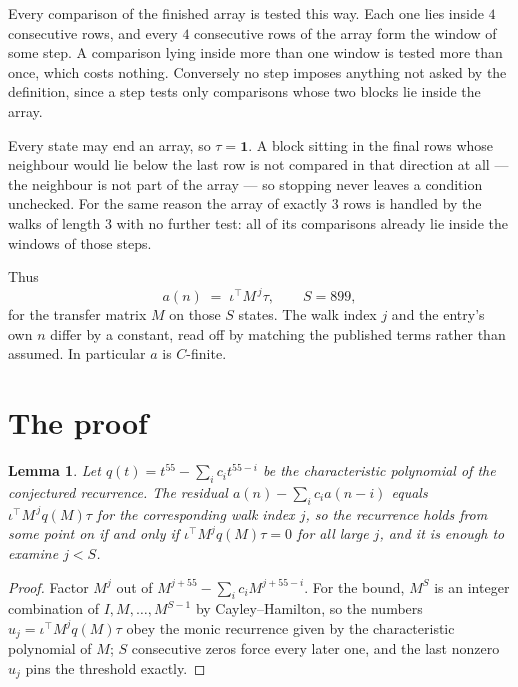 \documentclass[11pt,a4paper]{article}
\theoremstyle{plain}
\newtheorem{lemma}[theorem]{Lemma}
\theoremstyle{definition}
\begin{document}
Every comparison of the finished array is tested this way. Each one lies inside $4$
consecutive rows, and every $4$ consecutive rows of the array form the window of some
step. A comparison lying inside more than one window is tested more than once, which costs
nothing. Conversely no step imposes anything not asked by the definition, since a step tests
only comparisons whose two blocks lie inside the array.

Every state may end an array, so $\tau=\mathbf{1}$. A block sitting in the final rows whose
neighbour would lie below the last row is not compared in that direction at all --- the
neighbour is not part of the array --- so stopping never leaves a condition unchecked. For the
same reason the array of exactly $3$ rows is handled by the walks of length $3$ with no
further test: all of its comparisons already lie inside the windows of those steps.

Thus
\[
a(n)\;=\;\iota^{\!\top}M^{\,j}\tau ,\qquad S=899,
\]
for the transfer matrix $M$ on those $S$ states. The walk index $j$ and the entry's own $n$
differ by a constant, read off by matching the published terms rather than assumed. In
particular $a$ is $C$-finite.

\section{The proof}

\begin{lemma}\label{lem:crit}
Let $q(t)=t^{55}-\sum_i c_it^{55-i}$ be the characteristic polynomial of the
conjectured recurrence. The residual $a(n)-\sum_ic_ia(n-i)$ equals
$\iota^{\!\top}M^{\,j}q(M)\tau$ for the corresponding walk index $j$, so the recurrence
holds from some point on if and only if $\iota^{\!\top}M^{j}q(M)\tau=0$ for all large $j$,
and it is enough to examine $j<S$.
\end{lemma}

\begin{proof}
Factor $M^{j}$ out of $M^{j+55}-\sum_ic_iM^{j+55-i}$. For the bound, $M^{S}$
is an integer combination of $I,M,\dots,M^{S-1}$ by Cayley--Hamilton, so the numbers
$u_j=\iota^{\!\top}M^{j}q(M)\tau$ obey the monic recurrence given by the characteristic
polynomial of $M$; $S$ consecutive zeros force every later one, and the last nonzero $u_j$
pins the threshold exactly.
\end{proof}
\end{document}
